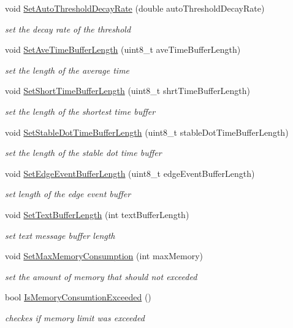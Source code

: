 \begin{DoxyCompactItemize}
void \hyperlink{classMorseDecode_a6fd8645b7dda1b84af1941a9f5d155af}{Set\+Auto\+Threshold\+Decay\+Rate} (double auto\+Threshold\+Decay\+Rate)
\begin{DoxyCompactList}\small\item\em set the decay rate of the threshold \end{DoxyCompactList}\item 
void \hyperlink{classMorseDecode_ae6da2e624d2ce1c8cbc1324757271627}{Set\+Ave\+Time\+Buffer\+Length} (uint8\+\_\+t ave\+Time\+Buffer\+Length)
\begin{DoxyCompactList}\small\item\em set the length of the average time \end{DoxyCompactList}\item 
void \hyperlink{classMorseDecode_ac3d5e669b19c651d522b7f271da53640}{Set\+Short\+Time\+Buffer\+Length} (uint8\+\_\+t shrt\+Time\+Buffer\+Length)
\begin{DoxyCompactList}\small\item\em set the length of the shortest time buffer \end{DoxyCompactList}\item 
void \hyperlink{classMorseDecode_aaaf7bfea0a9bcf523685da983b2bec20}{Set\+Stable\+Dot\+Time\+Buffer\+Length} (uint8\+\_\+t stable\+Dot\+Time\+Buffer\+Length)
\begin{DoxyCompactList}\small\item\em set the length of the stable dot time buffer \end{DoxyCompactList}\item 
void \hyperlink{classMorseDecode_a854d3dd4a5ec6a6a989543baa4d859c3}{Set\+Edge\+Event\+Buffer\+Length} (uint8\+\_\+t edge\+Event\+Buffer\+Length)
\begin{DoxyCompactList}\small\item\em set length of the edge event buffer \end{DoxyCompactList}\item 
void \hyperlink{classMorseDecode_a53d7aedff642bc7b0111454bf32678fb}{Set\+Text\+Buffer\+Length} (int text\+Buffer\+Length)
\begin{DoxyCompactList}\small\item\em set text message buffer length \end{DoxyCompactList}\item 
void \hyperlink{classMorseDecode_ab83ed381b8126b2fc50d9268abb1c30c}{Set\+Max\+Memory\+Consumption} (int max\+Memory)
\begin{DoxyCompactList}\small\item\em set the amount of memory that should not exceeded \end{DoxyCompactList}\item 
bool \hyperlink{classMorseDecode_a51cac4ec93e72a092348d09f21bc88c9}{Is\+Memory\+Consumtion\+Exceeded} ()
\begin{DoxyCompactList}\small\item\em checkes if memory limit was exceeded \end{DoxyCompactList}\end{DoxyCompactItemize}
